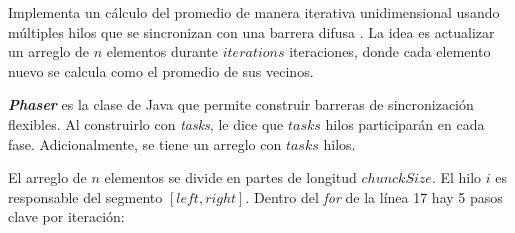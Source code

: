 \documentclass[12pt,a4paper]{article}
\begin{document}
Implementa un cálculo del promedio de manera iterativa unidimensional usando múltiples hilos que se sincronizan con una barrera difusa . La idea es actualizar un arreglo de $n$ elementos durante $iterations$ iteraciones, donde cada elemento nuevo se calcula como el promedio de sus vecinos. \newline \

\textit{\textbf{Phaser}} es la clase de Java que permite construir barreras de sincronización flexibles. Al construirlo con \textit{tasks}, le dice que $tasks$ hilos participarán en cada fase. Adicionalmente, se tiene un arreglo con $tasks$ hilos. \newline \

El arreglo de $n$ elementos se divide en partes de longitud $chunckSize$. El hilo $i$ es responsable del segmento $[left, right]$. Dentro del \textit{for} de la línea 17 hay 5 pasos clave por iteración:
\end{document}
